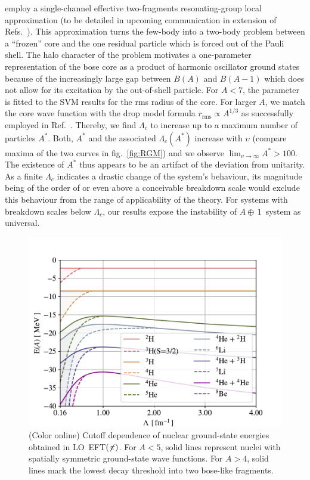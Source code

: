 \documentclass[aps,prl,onecolumn,groupedaddress,superscriptaddress]
{revtex4}
\newcommand{\lc}{\ensuremath{\Lambda_c}}
\newcommand{\abb}{\mbox{\ensuremath{A\oplus\,1}}}
\newcommand{\eftnopi}{\mbox{EFT$(\not \! \pi)$}}
\newcommand{\figref}[1]{fig.~\ref{#1}}
\begin{document}
employ a single-channel effective two-fragments resonating-group local
approximation (to be detailed in upcoming communication in extension of
Refs.~\cite{PhysRev.52.1083,Naidon_2016}). 
This approximation turns the few-body into a two-body problem
between a ``frozen'' core and the one residual particle which is forced out
of the Pauli shell.
The halo character of the problem motivates a one-parameter representation of 
the bose core as a product of harmonic oscillator
ground states because of
the increasingly large gap between $B(A)$ and $B(A-1)$ which does not
allow for its excitation by the out-of-shell
particle.
For $A<7$, the parameter is fitted to the SVM results for the rms radius of the core.
For larger $A$, we match the core wave function with the drop model
formula $r_\text{rms}\propto A^{1/3}$ as successfully employed in Ref.~\cite{manybosons}.
%    
Thereby, we find $\lc$ to increase up to a maximum number of particles $A^*$.
Both, $A^*$ and the associated $\lc(A^*)$ increase with $\upsilon$
(compare maxima of the two curves in \figref{fig:RGM}) and
we observe $\lim_{\upsilon\to\infty}A^*>100$.
The existence of $A^*$ thus appears to be an artifact of
the deviation from unitarity.
As a finite $\lc$ indicates a drastic change of the system's
behaviour, its magnitude being of the order of or even above a conceivable breakdown scale
would exclude this behaviour from the range of applicability of the theory.
For systems with breakdown scales below $\lc$, our results
expose the instability of \abb~system as universal.



\begin{figure}
\centering
\includegraphics[width=\linewidth]{./Nuclear.pdf} 
\caption{(Color online) Cutoff dependence of nuclear ground-state energies
obtained in LO~\eftnopi. For $A<5$, solid lines represent nuclei with
spatially symmetric ground-state wave functions. For $A>4$,
solid lines mark the lowest decay threshold into two bose-like fragments.}
\label{fig:nuclear}
\end{figure}
\end{document}

